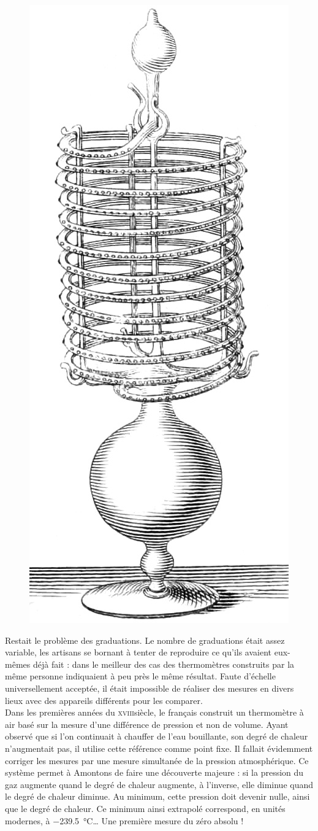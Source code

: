 	\begin{figure}
		\begin{center}
			\includegraphics[height=0.7\textwidth]{images/thermometre_florence_1667.jpg}
		\end{center}
		\label{fig_thermometre_florence}
	\end{figure}
	
	Restait le problème des graduations. Le nombre de graduations était assez variable, les artisans se bornant à tenter de reproduire ce qu'ils avaient eux-mêmes déjà fait : dans le meilleur des cas des thermomètres construits par la même personne indiquaient à peu près le même résultat. Faute d'échelle universellement acceptée, il était impossible de réaliser des mesures en divers lieux avec des appareils différents pour les comparer.\\
	Dans les premières années du \textsc{xviii}\ieme siècle, le français  construit un thermomètre à air basé sur la mesure d'une différence de pression et non de volume. Ayant observé que si l'on continuait à chauffer de l'eau bouillante, son degré de chaleur n'augmentait pas, il utilise cette référence comme point fixe. Il fallait évidemment corriger les mesures par une mesure simultanée de la pression atmosphérique. Ce système permet à Amontons de faire une découverte majeure : si la pression du gaz augmente quand le degré de chaleur augmente, à l'inverse, elle diminue quand le degré de chaleur diminue. Au minimum, cette pression doit devenir nulle, ainsi que le degré de chaleur. Ce minimum ainsi extrapolé correspond, en unités modernes, à \SI{-239,5}{\degreeCelsius}… Une première mesure du zéro absolu !
	
